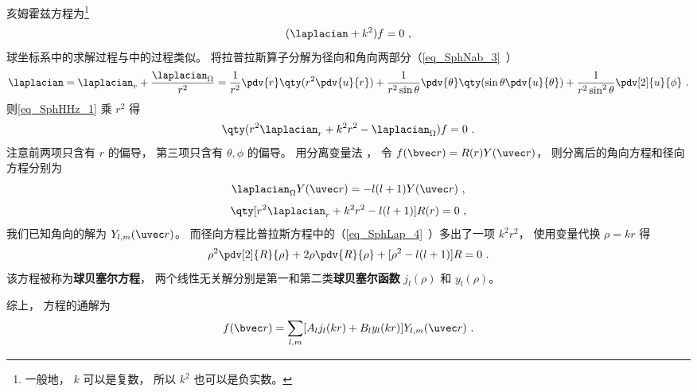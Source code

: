 

亥姆霍兹方程为\footnote{一般地， $k$ 可以是复数， 所以 $k^2$ 也可以是负实数。}
\begin{equation}\label{eq_SphHHz_1}
(\laplacian + k^2)f = 0~,
\end{equation}
球坐标系中的求解过程与中的过程类似。 将拉普拉斯算子分解为径向和角向两部分（\autoref{eq_SphNab_3}~）
\begin{equation}
\laplacian = \laplacian_r + \frac{\laplacian_{\Omega}}{r^2} = \frac{1}{r^2} \pdv{r} \qty(r^2 \pdv{u}{r}) + \frac{1}{r^2\sin\theta}\pdv{\theta} \qty(\sin \theta \pdv{u}{\theta}) + \frac{1}{r^2\sin^2 \theta} \pdv[2]{u}{\phi}~.
\end{equation}
则\autoref{eq_SphHHz_1} 乘 $r^2$ 得
\begin{equation}
\qty(r^2\laplacian_r + k^2 r^2 - \laplacian_\Omega) f = 0~.
\end{equation}
注意前两项只含有 $r$ 的偏导， 第三项只含有 $\theta,\phi$ 的偏导。 用分离变量法 %
， 令 $f(\bvec r) = R(r) Y(\uvec r)$， 则分离后的角向方程和径向方程分别为
\begin{equation}
\laplacian_{\Omega} Y(\uvec r) = -l(l+1) Y(\uvec r)~,
\end{equation}
\begin{equation}
\qty[r^2\laplacian_r + k^2 r^2 - l(l+1)] R(r) = 0~,
\end{equation}
我们已知角向的解为 $Y_{l,m}(\uvec r)$。 而径向方程比普拉斯方程中的（\autoref{eq_SphLap_4}~）多出了一项 $k^2r^2$， 使用变量代换 $\rho = kr$ 得
\begin{equation}
\rho^2\pdv[2]{R}{\rho} + 2\rho\pdv{R}{\rho} + [\rho^2 - l(l+1)] R = 0~.
\end{equation}
该方程被称为\textbf{球贝塞尔方程}， 两个线性无关解分别是第一和第二类\textbf{球贝塞尔函数} $j_l(\rho)$ 和 $y_l(\rho)$。

综上， 方程的通解为
\begin{equation}
f(\bvec r) = \sum_{l,m} [A_l j_l(kr) + B_l y_l(kr)] Y_{l,m}(\uvec r)~.
\end{equation}
